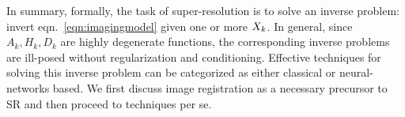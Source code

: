 In summary, formally, the task of super-resolution is to solve an inverse problem: invert eqn.~\eqref{eqn:imagingmodel} given one or more \(X_k\).
%
In general, since \(A_k, H_k, D_k\) are highly degenerate functions, the corresponding inverse problems are ill-posed without regularization and conditioning.
%
Effective techniques for solving this inverse problem can be categorized as either classical or neural-networks based. We first discuss image registration as a necessary precursor to SR and then proceed to techniques per se.
